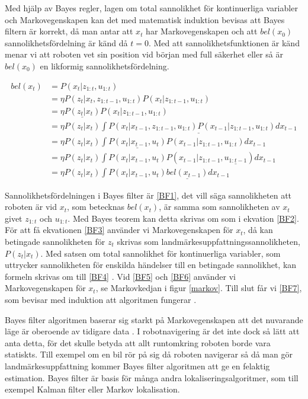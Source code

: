 Med hjälp av Bayes regler, lagen om total sannolikhet för kontinuerliga variabler och Markovegenskapen kan det med matematisk induktion bevisas att Bayes filtern är korrekt, då man antar att $x_t$ har Markovegenskapen och att $bel(x_0)$ sannolikhetsfördelning är känd då $t = 0$. Med att sannolikhetsfunktionen är känd menar vi att roboten vet sin position vid början med full säkerhet eller så är $bel(x_0)$ en likformig sannolikhetsfördelning.

\begin{align}
bel(x_t) & = P(x_t | z_{1:t}, u_{1:t}) \tag{BF1}\label{BF1} \\
        & = \eta P(z_t | x_t, z_{1:t-1}, u_{1:t}) P(x_t | z_{1:t-1}, u_{1:t}) \tag{BF2}\label{BF2}\\
        & = \eta \underline{P(z_t | x_t)} P(x_t | z_{1:t-1}, u_{1:t}) \tag{BF3}\label{BF3}\\
        & = \eta P(z_t | x_t) \underline{\int P(x_t | x_{t-1}, z_{1:t-1}, u_{1:t}) P(x_{t-1} | z_{1:t-1}, u_{1:t}) dx_{t-1}} \tag{BF4}\label{BF4}\\
        & = \eta P(z_t | x_t) \int \underline{P(x_t | x_{t-1}, u_t)} P(x_{t-1} | z_{1:t-1}, u_{1:t}) dx_{t-1} \tag{BF5}\label{BF5}\\
        & = \eta P(z_t | x_t) \int P(x_t | x_{t-1}, u_t) P(x_{t-1} | z_{1:t-1}, \underline{u_{1:t-1}}) dx_{t-1} \tag{BF6}\label{BF6}\\
        & = \eta P(z_t | x_t) \int P(x_t | x_{t-1}, u_t) \underline{bel(x_{t-1})} dx_{t-1} \tag{BF7}\label{BF7}
\end{align}

Sannolikhetsfördelningen i Bayes filter är \ref{BF1}, det vill säga sannolikheten att roboten är vid $x_t$, som betecknas $bel(x_t)$, är samma som sannolikheten av $x_t$ givet $z_{1:t}$ och $u_{1:t}$. Med Bayes teorem kan detta skrivas om som i ekvation \ref{BF2}. För att få ekvationen \ref{BF3} använder vi Markovegenskapen för $x_t$, då kan betingade sannolikheten för $z_t$ skrivas som landmärkesuppfattningssannolikheten, $P(z_t|x_t)$. Med satsen om total sannolikhet för kontinuerliga variabler, som uttrycker sannolikheten för enskilda händelser till en betingade sannolikhet, kan formeln skrivas om till \ref{BF4} \citep[Kapitel~2.2]{ProbabilisticRobotics}. Vid \ref{BF5} och \ref{BF6} använder vi Markovegenskapen för $x_t$, se Markovkedjan i figur \ref{markov}. Till slut får vi \ref{BF7}, som bevisar med induktion att algoritmen fungerar \citep{ProbabilisticRobotics}.

Bayes filter algoritmen baserar sig starkt på Markovegenskapen att det nuvarande läge är oberoende av tidigare data \citep{ProbabilisticRobotics}. I robotnavigering är det inte dock så lätt att anta detta, för det skulle betyda att allt runtomkring roboten borde vara statiskts. Till exempel om en bil rör på sig då roboten navigerar så då man gör landmärkesuppfattning kommer Bayes filter algoritmen att ge en felaktig estimation. Bayes filter är basis för många andra lokaliseringsalgoritmer, som till exempel Kalman filter eller Markov lokalisation. 

